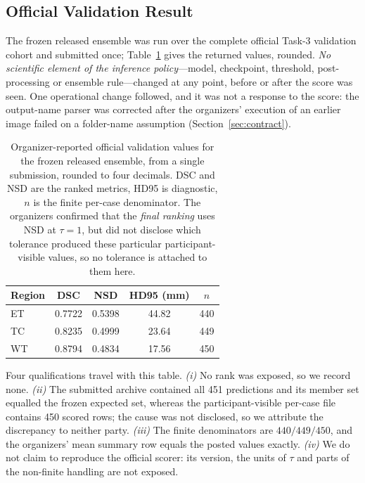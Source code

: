 \documentclass[runningheads]{llncs}
\begin{document}
\subsection{Official Validation Result}
\label{sec:official}
The frozen released ensemble was run over the complete official Task-3 validation cohort and
submitted once; Table~\ref{tab:official} gives the returned values, rounded. \emph{No scientific
element of the inference policy}---model, checkpoint, threshold, post-processing or ensemble
rule---changed at any point, before or after the score was seen. One operational change followed, and
it was not a response to the score: the output-name parser was corrected after the organizers'
execution of an earlier image failed on a folder-name assumption (Section~\ref{sec:contract}).

\begin{table}[htbp]
\centering
\caption{Organizer-reported official validation values for the frozen released ensemble, from a single
submission, rounded to four decimals. DSC and NSD are the ranked metrics, HD95 is diagnostic, $n$ is
the finite per-case denominator. The organizers confirmed that the \emph{final ranking} uses NSD at
$\tau=1$, but did not disclose which tolerance produced these particular participant-visible values,
so no tolerance is attached to them here.}
\label{tab:official}
\begin{tabular}{@{}lcccc@{}}
\toprule
Region & DSC & NSD & HD95 (mm) & $n$ \\
\midrule
ET & 0.7722 & 0.5398 & 44.82 & 440 \\
TC & 0.8235 & 0.4999 & 23.64 & 449 \\
WT & 0.8794 & 0.4834 & 17.56 & 450 \\
\bottomrule
\end{tabular}
\end{table}

Four qualifications travel with this table. \emph{(i)} No rank was exposed, so we record none.
\emph{(ii)} The submitted archive contained all 451 predictions and its member set equalled the
frozen expected set, whereas the participant-visible per-case file contains 450 scored rows; the
cause was not disclosed, so we attribute the discrepancy to neither party. \emph{(iii)} The finite
denominators are $440/449/450$, and the organizers' mean summary row equals the posted values
exactly. \emph{(iv)} We do not claim to reproduce the official scorer: its version, the units of
$\tau$ and parts of the non-finite handling are not exposed.
\end{document}

